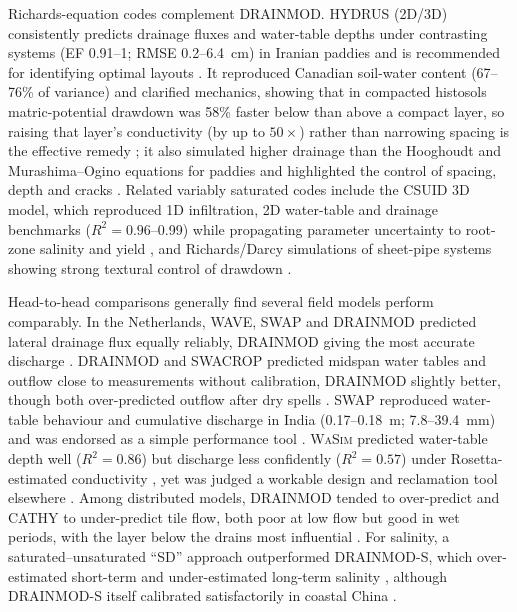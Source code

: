 \documentclass[11pt]{article}
\begin{document}
Richards-equation codes complement \textsc{DRAINMOD}. HYDRUS (2D/3D) consistently predicts drainage fluxes and water-table depths under contrasting systems (EF 0.91--1; RMSE 0.2--6.4~cm) in Iranian paddies and is recommended for identifying optimal layouts \parencite{Karandish2018,DarziNaftchali2018}. It reproduced Canadian soil-water content (67--76\% of variance) and clarified mechanics, showing that in compacted histosols matric-potential drawdown was 58\% faster below than above a compact layer, so raising that layer's conductivity (by up to $50\times$) rather than narrowing spacing is the effective remedy \parencite{Mante2018,Guedessou2021}; it also simulated higher drainage than the Hooghoudt and Murashima--Ogino equations for paddies and highlighted the control of spacing, depth and cracks \parencite{Ebrahimian2015}. Related variably saturated codes include the CSUID 3D model, which reproduced 1D infiltration, 2D water-table and drainage benchmarks ($R^2=0.96$--0.99) while propagating parameter uncertainty to root-zone salinity and yield \parencite{Alzraiee2013b,Alzraiee2013}, and Richards/Darcy simulations of sheet-pipe systems showing strong textural control of drawdown \parencite{Saptomo2021,Li2021}.

Head-to-head comparisons generally find several field models perform comparably. In the Netherlands, WAVE, SWAP and \textsc{DRAINMOD} predicted lateral drainage flux equally reliably, \textsc{DRAINMOD} giving the most accurate discharge \parencite{ElSadek2001}. \textsc{DRAINMOD} and SWACROP predicted midspan water tables and outflow close to measurements without calibration, \textsc{DRAINMOD} slightly better, though both over-predicted outflow after dry spells \parencite{Prasher1996}. SWAP reproduced water-table behaviour and cumulative discharge in India (0.17--0.18~m; 7.8--39.4~mm) and was endorsed as a simple performance tool \parencite{Verma2014}. \textsc{WaSim} predicted water-table depth well ($R^2=0.86$) but discharge less confidently ($R^2=0.57$) under Rosetta-estimated conductivity \parencite{Malota2022}, yet was judged a workable design and reclamation tool elsewhere \parencite{Hirekhan2007,Malota2024}. Among distributed models, \textsc{DRAINMOD} tended to over-predict and CATHY to under-predict tile flow, both poor at low flow but good in wet periods, with the layer below the drains most influential \parencite{Muma2017}. For salinity, a saturated--unsaturated ``SD'' approach outperformed \textsc{DRAINMOD-S}, which over-estimated short-term and under-estimated long-term salinity \parencite{Nozari2021}, although \textsc{DRAINMOD-S} itself calibrated satisfactorily in coastal China \parencite{Feng2018}.
\end{document}
